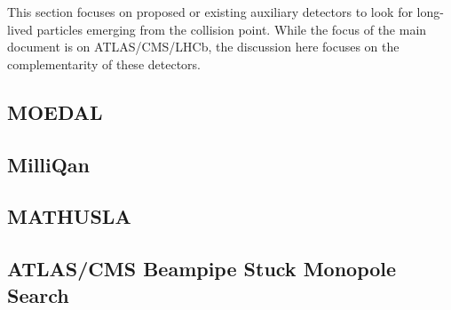 This section focuses on proposed or existing auxiliary detectors to look for long-lived particles emerging from the collision point. While the focus of the main document is on ATLAS/CMS/LHCb, the discussion here focuses on the complementarity of these detectors.

\subsection{MOEDAL}

\subsection{MilliQan}

\subsection{MATHUSLA}

\subsection{ATLAS/CMS Beampipe Stuck Monopole Search}


